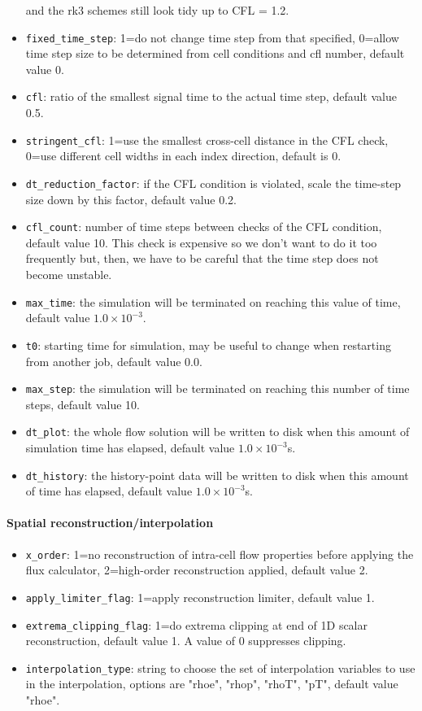 \begin{itemize}
  and the rk3 schemes still look tidy up to CFL = 1.2.
\item \texttt{fixed\_time\_step}\ddag: 1=do not change time step from that specified, 
  0=allow time step size to be determined from cell conditions and cfl number, default value 0.
\item \texttt{cfl}\ddag: ratio of the smallest signal time to the actual time step,
  default value 0.5.
\item \texttt{stringent\_cfl}\ddag: 1=use the smallest cross-cell distance in the
  CFL check, 0=use different cell widths in each index direction, default is 0.
\item \texttt{dt\_reduction\_factor}\ddag: if the CFL condition is violated, scale the time-step size
  down by this factor, default value 0.2.
\item \texttt{cfl\_count}: number of time steps between checks of the CFL
  condition, default value 10.
  This check is expensive so we don't want to do it too frequently but, then,
  we have to be careful that the time step does not become unstable.
\item \texttt{max\_time}\ddag: the simulation will be terminated on reaching this
  value of time, default value $1.0 \times 10^{-3}$.
\item \texttt{t0}: starting time for simulation, may be useful to change when restarting from another job,
  default value 0.0.
\item \texttt{max\_step}\ddag: the simulation will be terminated on reaching this
  number of time steps, default value 10.
\item \texttt{dt\_plot}\ddag: the whole flow solution will be written to disk when
  this amount of simulation time has elapsed, default value $1.0 \times 10^{-3}$s.
\item \texttt{dt\_history}\ddag: the history-point data will be written to disk
  when this amount of time has elapsed, default value $1.0 \times 10^{-3}$s.
\end{itemize}

\paragraph{Spatial reconstruction/interpolation}
\begin{itemize}
\item \texttt{x\_order}\ddag: 1=no reconstruction of intra-cell flow properties
  before applying the flux calculator, 2=high-order reconstruction applied, 
  default value 2.
\item \texttt{apply\_limiter\_flag}: 1=apply reconstruction limiter, default value 1.
\item \texttt{extrema\_clipping\_flag}: 1=do extrema clipping at end of 1D scalar reconstruction,
  default value 1.  A value of 0 suppresses clipping.
\item \texttt{interpolation\_type}: string to choose the set of interpolation variables
  to use in the interpolation, options are "rhoe", "rhop", "rhoT", "pT", default value "rhoe".
\end{itemize}

